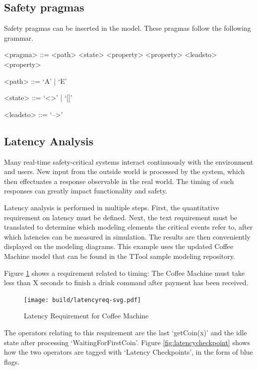 \documentclass[12pt]{article}
\begin{document}
\subsection{Safety pragmas}
Safety pragmas can be inserted in the model. These pragmas follow the following grammar.

\setlength{\grammarparsep}{20pt plus 1pt minus 1pt} %
\setlength{\grammarindent}{12em} %

\begin{grammar}

<pragma> ::= <path> <state> <property> 
\alt <property> <leadsto> <property> 

<path> ::=  `A'  |   `E' 

<state> ::=  `<>'  |   `[]' 

<leadsto> ::=  `-->'  

\end{grammar}

\subsection{Latency Analysis}


Many real-time safety-critical systems interact continuously with the environment and users. New input from the outside world is processed by the system, which then effectuates a response observable in the real world. The timing of such responses can greatly impact functionality and safety.

Latency analysis is performed in multiple steps. First, the quantitative requirement on latency must be defined. Next, the text requirement must be translated to determine which modeling elements the critical events refer to, after which latencies can be measured in simulation. The results are then conveniently displayed on the modeling diagrams. This example uses the updated Coffee Machine model that can be found in the TTool sample modeling repository.

Figure \ref{fig:latencyreq} shows a requirement related to timing: The Coffee Machine must take less than X seconds to finish a drink command after payment has been received. 

\begin{figure}[htbp]
\centering
\texttt{[image: build/latencyreq-svg.pdf]}
\caption{Latency Requirement for Coffee Machine} \label{fig:latencyreq}
\end{figure}

The operators relating to this requirement are the last `getCoin(x)' and the idle state after processing `WaitingForFirstCoin'. Figure \ref{fig:latencycheckpoint} shows how the two operators are tagged with `Latency Checkpoints', in the form of blue flags.
\end{document}
